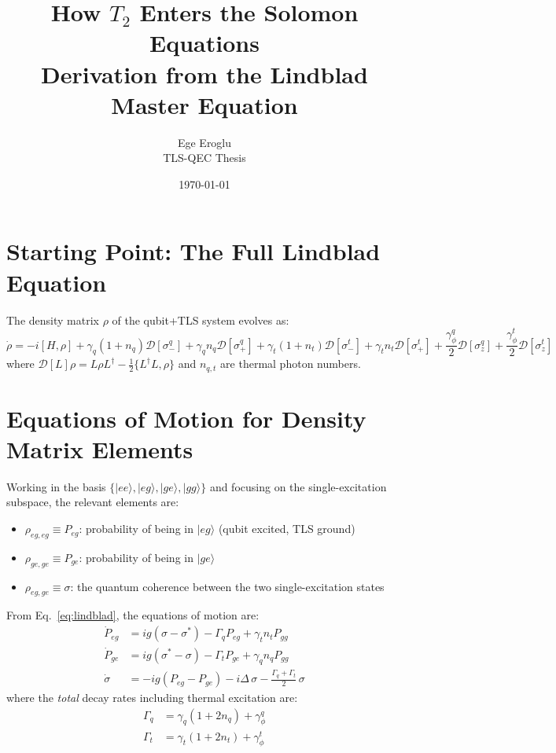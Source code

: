 \documentclass[12pt,a4paper]{article}
\title{\textbf{How $T_2$ Enters the Solomon Equations}\\[0.4em]
\large Derivation from the Lindblad Master Equation}
\author{Ege Eroglu \\ TLS-QEC Thesis}
\date{\today}
\newcommand{\gq}{\gamma_q}
\newcommand{\gt}{\gamma_t}
\newcommand{\gph}{\gamma_\phi}
\newcommand{\D}{\Delta}
\begin{document}
\maketitle

\section{Starting Point: The Full Lindblad Equation}

The density matrix $\rho$ of the qubit+TLS system evolves as:
\begin{equation}
    \dot\rho = -i[H,\rho]
    + \gq(1+n_q)\mathcal{D}[\sigma_-^q]
    + \gq n_q \mathcal{D}[\sigma_+^q]
    + \gt(1+n_t)\mathcal{D}[\sigma_-^t]
    + \gt n_t \mathcal{D}[\sigma_+^t]
    + \frac{\gph^q}{2}\mathcal{D}[\sigma_z^q]
    + \frac{\gph^t}{2}\mathcal{D}[\sigma_z^t]
    \label{eq:lindblad}
\end{equation}
where $\mathcal{D}[L]\rho = L\rho L^\dagger - \tfrac{1}{2}\{L^\dagger L,\rho\}$
and $n_{q,t}$ are thermal photon numbers.

\section{Equations of Motion for Density Matrix Elements}

Working in the basis $\{|ee\rangle, |eg\rangle, |ge\rangle, |gg\rangle\}$
and focusing on the single-excitation subspace, the relevant elements are:
\begin{itemize}
    \item $\rho_{eg,eg} \equiv P_{eg}$: probability of being in $|eg\rangle$
          (qubit excited, TLS ground)
    \item $\rho_{ge,ge} \equiv P_{ge}$: probability of being in $|ge\rangle$
    \item $\rho_{eg,ge} \equiv \sigma$: the quantum coherence between the
          two single-excitation states
\end{itemize}

From Eq.~\eqref{eq:lindblad}, the equations of motion are:
\begin{align}
    \dot{P}_{eg} &= ig(\sigma - \sigma^*)
        - \Gamma_q P_{eg} + \gt n_t P_{gg} \label{eq:Peg}\\
    \dot{P}_{ge} &= ig(\sigma^* - \sigma)
        - \Gamma_t P_{ge} + \gq n_q P_{gg} \label{eq:Pge}\\
    \dot{\sigma} &= -ig(P_{eg} - P_{ge})
        - i\D\,\sigma
        - \frac{\Gamma_q + \Gamma_t}{2}\,\sigma
        \label{eq:sigma}
\end{align}
where the \emph{total} decay rates including thermal excitation are:
\begin{align}
    \Gamma_q &= \gq(1 + 2n_q) + \gph^q \\
    \Gamma_t &= \gt(1 + 2n_t) + \gph^t
\end{align}
\end{document}
